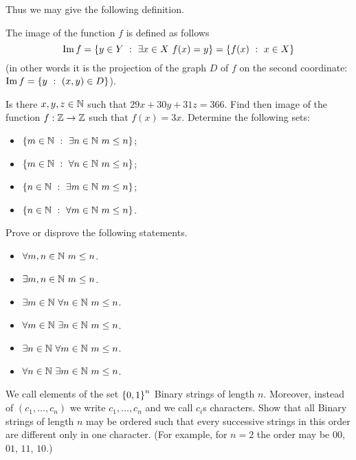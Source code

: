Thus we may give the following definition.
\begin{definition}
    The image of the function $f$ is defined as follows
    \[
        \Im f = \set[\exists x \in X\ f(x) = y]{y \in Y}
        = \set[x \in X]{f(x)}
    \]
    (in other words it is the projection of the graph $D$ of $f$ on the second
    coordinate: $\Im f = \set[(x, y) \in D]{y}$).
\end{definition}

\begin{chapterendexercises}
    \exercise Is there $x, y, z \in {\mathbb{N}}$ such that $29x + 30y + 31z = 366$.
    \exercise Find then image of the function $f : {\mathbb{Z}} \to {\mathbb{Z}}$ such that
        $f(x) = 3x$.
    \exercise[recommended] Determine the following sets:
        \begin{itemize}
            \item $\set[\exists n \in \N \ m \le n]{m \in \N}$;
            \item $\set[\forall n \in \N \ m \le n]{m \in \N}$;
            \item $\set[\exists m \in \N \ m \le n]{n \in \N}$;
            \item $\set[\forall m \in \N \ m \le n]{n \in \N}$.
        \end{itemize}
    \exercise Prove or disprove the following statements.
        \begin{itemize}
            \item $\forall m, n \in {\mathbb{N}} \  m \le n$.
            \item $\exists m, n \in {\mathbb{N}} \ m \le n$.
            \item $\exists m \in {\mathbb{N}} \  \forall n \in {\mathbb{N}} \  m \le n$.
            \item $\forall m \in {\mathbb{N}} \  \exists n \in {\mathbb{N}} \  m \le n$.
            \item $\exists n \in {\mathbb{N}} \  \forall m \in {\mathbb{N}} \  m \le n$.
            \item $\forall n \in {\mathbb{N}} \  \exists m \in {\mathbb{N}} \  m \le n$.
        \end{itemize}
    \exercise[recommended]
      We call elements of the set $\set{0, 1}^n$ Binary strings of length
      $n$. Moreover, instead of $(c_1, \dots, c_n)$ we write $c_1, \dots, c_n$
      and we call $c_i$s characters.
      Show that all Binary strings of length $n$
      may be ordered such that every successive strings in this order are
      different only in one character.
      (For example, for $n = 2$ the order may be $00$, $01$, $11$, $10$.)
\end{chapterendexercises}
